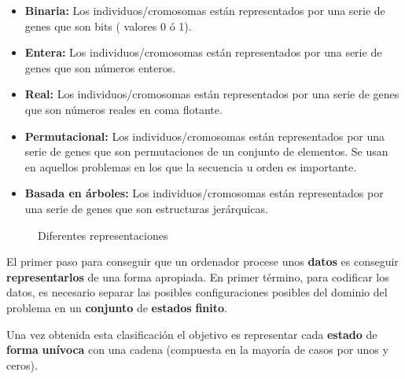 \documentclass[
  a4paper,
  DIV=11,
  numbers=noendperiod]{scrreprt}
\begin{document}
\begin{itemize}
\item
  \textbf{Binaria:} Los individuos/cromosomas están representados por
  una serie de genes que son bits ( valores 0 ó 1).
\item
  \textbf{Entera:} Los individuos/cromosomas están representados por una
  serie de genes que son números enteros.
\item
  \textbf{Real:} Los individuos/cromosomas están representados por una
  serie de genes que son números reales en coma flotante.
\item
  \textbf{Permutacional:} Los individuos/cromosomas están representados
  por una serie de genes que son permutaciones de un conjunto de
  elementos. Se usan en aquellos problemas en los que la secuencia u
  orden es importante.
\item
  \textbf{Basada en árboles:} Los individuos/cromosomas están
  representados por una serie de genes que son estructuras jerárquicas.
\end{itemize}

\begin{figure}


\caption{\label{fig-representaciones-individuo}Diferentes
representaciones}

\end{figure}%

El primer paso para conseguir que un ordenador procese unos
\textbf{datos} es conseguir \textbf{representarlos} de una forma
apropiada. En primer término, para codificar los datos, es necesario
separar las posibles configuraciones posibles del dominio del problema
en un \textbf{conjunto} de \textbf{estados} \textbf{finito}.

Una vez obtenida esta clasificación el objetivo es representar cada
\textbf{estado} de \textbf{forma} \textbf{unívoca} con una cadena
(compuesta en la mayoría de casos por unos y ceros).
\end{document}
